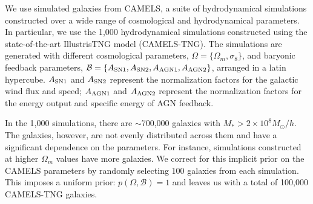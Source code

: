 We use simulated galaxies from CAMELS, a suite of hydrodynamical
simulations constructed over a wide range of cosmological and
hydrodynamical parameters.
In particular, we use the 1,000 hydrodynamical simulations constructed using
the state-of-the-art IllustrisTNG model (CAMELS-TNG). 
The simulations are generated with different cosmological parameters,
$\Omega = \{\Omega_m, \sigma_8\}$, and baryonic feedback parameters, 
$\mathcal{B} = \{A_{\rm SN1}, A_{\rm SN2}, A_{\rm AGN1}, A_{\rm AGN2}\}$,
arranged in a latin hypercube. 
$A_{\rm SN1}$ and $A_{\rm SN2}$ represent the normalization factors for the 
galactic wind flux and speed; 
$A_{\rm AGN1}$ and $A_{\rm AGN2}$ represent the normalization factors for the 
energy output and specific energy of AGN feedback.

In the 1,000 simulations, there are $\sim$700,000 galaxies with 
$M_* > 2\times10^8 M_\odot/h$. 
The galaxies, however, are not evenly distributed across them and have a
significant dependence on the parameters.  
For instance, simulations constructed at higher $\Omega_m$ values have more
galaxies.  
We correct for this implicit prior on the CAMELS parameters by randomly
selecting 100 galaxies from each simulation. 
This imposes a uniform prior: $p(\Omega, \mathcal{B}) = 1$ and leaves us with 
a total of 100,000 CAMELS-TNG galaxies.  

